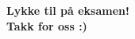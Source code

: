 \begin{frame}
    \begin{center}
        \begin{Large}
        \textbf{
            Lykke til på eksamen!\\[5mm]
            Takk for oss :)
        }
        \end{Large}
    \end{center}  
\end{frame}